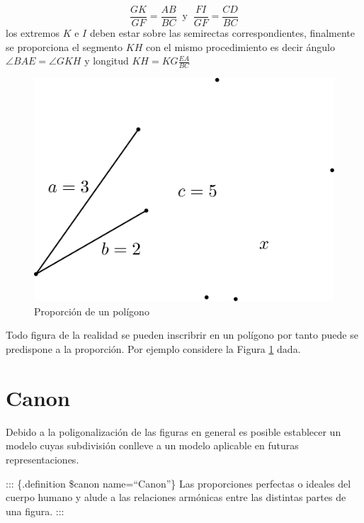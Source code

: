 \documentclass[
  11pt,
]{krantz}
\theoremstyle{definition}
\theoremstyle{definition}
\theoremstyle{definition}
\theoremstyle{definition}
\theoremstyle{remark}
\begin{document}
\[
\frac{GK}{GF}=\frac{AB}{BC}\: \text{ y }\: \frac{FI}{GF}=\frac{CD}{BC}
\]los extremos \(K\) e \(I\) deben estar sobre las semirectas correspondientes, finalmente se proporciona el segmento \(KH\) con el mismo procedimiento es decir ángulo \(\angle BAE=\angle GKH\) y longitud \(KH=KG\frac{EA}{BC}\)

\begin{figure}

{\centering \includegraphics[width=1\linewidth,height=1\textheight]{proporcion} 

}

\caption{Proporción de un polígono}\label{fig:ww}
\end{figure}

Todo figura de la realidad se pueden inscribrir en un polígono por tanto puede se predispone a la proporción. Por ejemplo considere la Figura \ref{fig:ww} dada.

\hypertarget{canon}{%
\section{Canon}\label{canon}}

Debido a la poligonalización de las figuras en general es posible establecer un modelo cuyas subdivisión conlleve a un modelo aplicable en futuras representaciones.

::: \{.definition \$canon name=``Canon''\}
Las proporciones perfectas o ideales del cuerpo humano y alude a las relaciones armónicas entre las distintas partes de una figura.
:::
\end{document}
